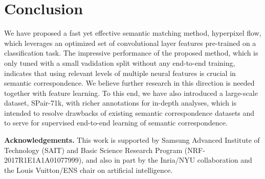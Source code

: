 \documentclass[10pt,twocolumn,letterpaper]{article}
\begin{document}
 \section{Conclusion}
We have proposed a fast yet effective semantic matching method, hyperpixel flow, which leverages an optimized set of convolutional layer features pre-trained on a classification task. The impressive performance of the proposed method, which is only tuned with a small vadidation split without any end-to-end training, indicates that using relevant levels of multiple neural features is crucial in semantic correspondence. We believe further research in this direction is needed together with feature learning.  
To this end, we have also introduced a large-scale dataset, SPair-71k, with richer annotations for in-depth analyses, which is intended to resolve drawbacks of existing semantic correspondence datasets and to serve for supervised end-to-end learning of semantic correspondence.  




\smallbreak
\noindent \textbf{Acknowledgements.}
This work is supported by Samsung Advanced Institute of Technology (SAIT) and Basic Science Research Program (NRF-2017R1E1A1A01077999), and also in part by the Inria/NYU collaboration and the Louis Vuitton/ENS chair on artificial intelligence.






 

{\small


}
\end{document}
